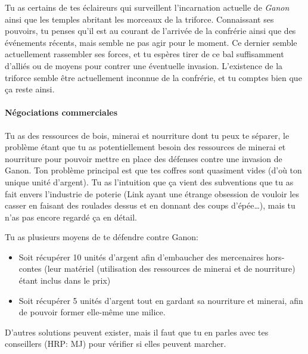 {	\par Tu as certains de tes éclaireurs qui surveillent l'incarnation actuelle de \emph{Ganon} ainsi que les temples abritant les morceaux de la triforce. Connaissant ses pouvoirs, tu penses qu'il est au courant de l'arrivée de la confrérie ainsi que des événements récents, mais semble ne pas agir pour le moment. Ce dernier semble actuellement rassembler ses forces, et tu espères tirer de ce bal suffisamment d'alliés ou de moyens pour contrer une éventuelle invasion. L'existence de la triforce semble être actuellement inconnue de la confrérie, et tu comptes bien que ça reste ainsi.
	
	
	\paragraph{Négociations commerciales} Tu as des ressources de bois, minerai et nourriture dont tu peux te séparer, le problème étant que tu as potentiellement besoin des ressources de minerai et nourriture pour pouvoir mettre en place des défenses contre une invasion de Ganon. Ton problème principal est que tes coffres sont quasiment vides (d'où ton unique unité d'argent). Tu as l'intuition que ça vient des subventions que tu as fait envers l'industrie de poterie (Link ayant une étrange obsession de vouloir les casser en faisant des roulades dessus et en donnant des coups d'épée\dots), mais tu n'as pas encore regardé ça en détail.
	
	\par Tu as plusieurs moyens de te défendre contre Ganon:
	\begin{itemize}
		\item Soit récupérer 10 unités d'argent afin d'embaucher des mercenaires hors-contes (leur matériel (utilisation des ressources de minerai et de nourriture) étant inclus dans le prix)
		\item Soit récupérer 5 unités d'argent tout en gardant sa nourriture et minerai, afin de pouvoir former elle-même une milice.
	\end{itemize}
	D'autres solutions peuvent exister, mais il faut que tu en parles avec tes conseillers (HRP: MJ) pour vérifier si elles peuvent marcher.
}


